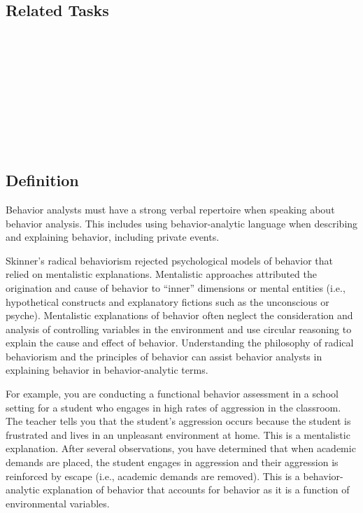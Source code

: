 \subsection{Related Tasks}
\fourgSix{}\\
\fouriSix{}\\
\fourjSix{}\\
\fourjSeven{}\\
\fourkOne{}\\
\fourkThree{}\\
\fourkEight{}\\
\fourkNine{}\\
%
%
%
%
%
%
\section[\fourgFive{}]{\fourgFive{}%
              }
\subsection{Definition}
Behavior analysts must have a strong verbal repertoire when speaking about behavior analysis.  This includes using behavior-analytic language when describing and explaining behavior, including private events.  

Skinner's radical behaviorism rejected psychological models of behavior that relied on mentalistic explanations. Mentalistic approaches attributed the origination and cause of behavior to ``inner'' dimensions or mental entities (i.e., hypothetical constructs and explanatory fictions such as the unconscious or psyche).  Mentalistic explanations of behavior often neglect the consideration and analysis of controlling variables in the environment and use circular reasoning to explain the cause and effect of behavior.  Understanding the philosophy of radical behaviorism and the principles of behavior can assist behavior analysts in explaining behavior in behavior-analytic terms.

For example, you are conducting a functional behavior assessment in a school setting for a student who engages in high rates of aggression in the classroom.  The teacher tells you that the student's aggression occurs because the student is frustrated and lives in an unpleasant environment at home.  This is a mentalistic explanation.  After several observations, you have determined that when academic demands are placed, the student engages in aggression and their aggression is reinforced by escape (i.e., academic demands are removed). This is a behavior-analytic explanation of behavior that accounts for behavior as it is a function of environmental variables.  

